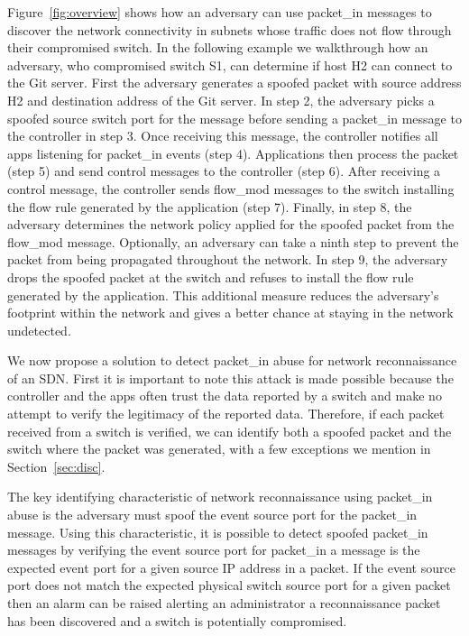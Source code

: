 Figure~\ref{fig:overview} shows how an adversary can use packet\_in 
messages to discover the network connectivity in subnets whose traffic
does not flow through their compromised switch. In the following example
we walkthrough how an adversary, who compromised switch S1, can 
determine if host H2 can connect to the Git server. First the adversary 
generates a spoofed packet with source address H2 and destination address
of the Git server. In step 2, the adversary picks a spoofed source switch
port for the message before sending a packet\_in message to the controller
in step 3. Once receiving this message, the controller notifies all apps
listening for packet\_in events (step 4). Applications then process the 
packet (step 5) and send control messages to the controller (step 6).
After receiving a control message, the controller sends flow\_mod messages
to the switch installing the flow rule generated by the application (step 
7). Finally, in step 8, the adversary determines the network policy 
applied for the spoofed packet from the flow\_mod message. Optionally, an
adversary can take a ninth step to prevent the packet from being 
propagated throughout the network. In step 9,  the adversary drops the
spoofed packet at the switch and refuses to install the flow rule
generated by the application. This additional measure reduces the 
adversary's footprint within the network and gives a better chance at
staying in the network undetected.

We now propose a solution to detect packet\_in abuse for network
reconnaissance of an SDN. First it is important to note this attack is
made possible because the controller and the apps often trust the data
reported by a switch and make no attempt to verify the legitimacy of the
reported data. Therefore, if each packet received from a switch is
verified, we can identify both a spoofed packet and the switch where the
packet was generated, with a few exceptions we mention in
Section~\ref{sec:disc}. 

The key identifying characteristic of network reconnaissance using 
packet\_in abuse is the adversary must spoof the event source port for
the packet\_in message. Using this characteristic, it is possible to
detect spoofed packet\_in messages by verifying the event source port
for packet\_in a message is the expected event port for a given source 
IP address in a packet. If the event source port does not match the
expected physical switch source port for a given packet then an alarm
can be raised alerting an administrator a reconnaissance packet has 
been discovered and a switch is potentially compromised. 

